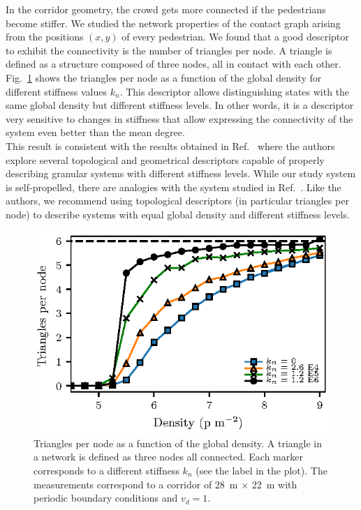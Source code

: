\documentclass[preprint,12pt]{elsarticle}
\begin{document}
In the corridor geometry, the crowd gets more connected if the pedestrians become stiffer. We studied the network properties of the contact graph arising from the positions $(x,y)$ of every pedestrian. We found that a good descriptor to exhibit the connectivity is the number of triangles per node. A triangle is defined as a structure composed of three nodes, all in contact with each other. Fig.~\ref{triangles} shows the triangles per node as a function of the global density for different stiffness values $k_n$. This descriptor allows distinguishing states with the same global density but different stiffness levels. In other words, it is a descriptor very sensitive to changes in stiffness that allow expressing the connectivity of the system even better than the mean degree. \\

This result is consistent with the results obtained in Ref.~\cite{pugnaloni_2013} where the authors explore several topological and geometrical descriptors capable of properly describing granular systems with different stiffness levels. While our study system is self-propelled, there are analogies with the system studied in Ref.~\cite{pugnaloni_2013}. Like the authors, we recommend using topological descriptors (in particular triangles per node) to describe systems with equal global density and different stiffness levels.\\

\begin{figure}[htbp!]
\centering
\includegraphics[width=0.7\columnwidth]
{./triangles.eps}
\caption{\label{triangles} Triangles per node as a function of the global density. A triangle in a network is defined as three nodes all connected. Each marker corresponds to a different stiffness $k_n$ (see the label in the plot). The measurements correspond to a corridor of 28~m $\times$ 22~m with periodic boundary conditions and $v_d=1$.  }
\end{figure}
\end{document}
